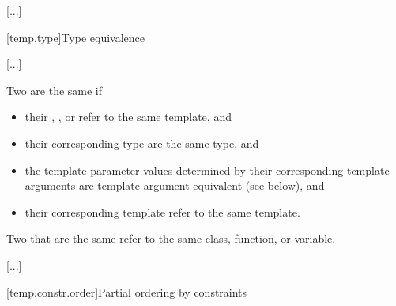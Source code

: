 \documentclass{wg21}
\begin{document}
\textcolor{noteclr}{[...]}

[temp.type]{Type equivalence}

\textcolor{noteclr}{[...]}

\pnum
{}%
Two  are the same if
\begin{itemize}
    \item
    their ,
    , or
    refer to the same template, and

    \item
    their corresponding type 
    are the same type, and

    \item
    the template parameter values determined by
    their corresponding  template arguments
    are template-argument-equivalent (see below), and

    \item
    their corresponding template 
    refer to the same template.
\end{itemize}

Two  that are the same
refer to the same class, function, or variable.

\textcolor{noteclr}{[...]}


[temp.constr.order]{Partial ordering by constraints}
\end{document}
